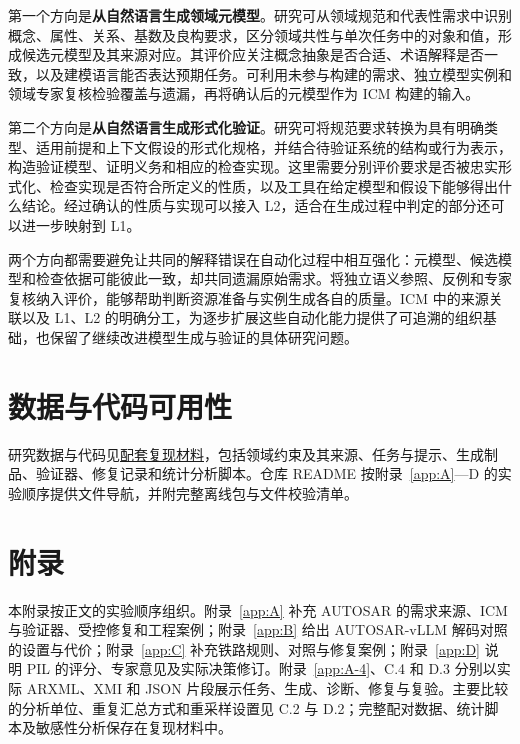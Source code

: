 \documentclass[pdflatex,iicol,sn-mathphys-num]{sn-jnl}
\begin{document}
第一个方向是\textbf{从自然语言生成领域元模型}。研究可从领域规范和代表性需求中识别概念、属性、关系、基数及良构要求，区分领域共性与单次任务中的对象和值，形成候选元模型及其来源对应。其评价应关注概念抽象是否合适、术语解释是否一致，以及建模语言能否表达预期任务。可利用未参与构建的需求、独立模型实例和领域专家复核检验覆盖与遗漏，再将确认后的元模型作为 ICM 构建的输入。


第二个方向是\textbf{从自然语言生成形式化验证}。研究可将规范要求转换为具有明确类型、适用前提和上下文假设的形式化规格，并结合待验证系统的结构或行为表示，构造验证模型、证明义务和相应的检查实现。这里需要分别评价要求是否被忠实形式化、检查实现是否符合所定义的性质，以及工具在给定模型和假设下能够得出什么结论。经过确认的性质与实现可以接入 L2，适合在生成过程中判定的部分还可以进一步映射到 L1。


两个方向都需要避免让共同的解释错误在自动化过程中相互强化：元模型、候选模型和检查依据可能彼此一致，却共同遗漏原始需求。将独立语义参照、反例和专家复核纳入评价，能够帮助判断资源准备与实例生成各自的质量。ICM 中的来源关联以及 L1、L2 的明确分工，为逐步扩展这些自动化能力提供了可追溯的组织基础，也保留了继续改进模型生成与验证的具体研究问题。


\section*{数据与代码可用性}\label{sec:data-availability}

研究数据与代码见\href{https://github.com/Abandooon/AI_XmlGenerator/tree/ATLAS}{配套复现材料}，包括领域约束及其来源、任务与提示、生成制品、验证器、修复记录和统计分析脚本。仓库 README 按附录~\ref{app:A}—D 的实验顺序提供文件导航，并附完整离线包与文件校验清单。


\FloatBarrier

\appendix

\section*{附录}

\renewcommand{\thetable}{\thesection\arabic{table}}

\renewcommand{\theHtable}{\thesection.\arabic{table}}

本附录按正文的实验顺序组织。附录~\ref{app:A} 补充 AUTOSAR 的需求来源、ICM 与验证器、受控修复和工程案例；附录~\ref{app:B} 给出 AUTOSAR-vLLM 解码对照的设置与代价；附录~\ref{app:C} 补充铁路规则、对照与修复案例；附录~\ref{app:D} 说明 PIL 的评分、专家意见及实际决策修订。附录~\ref{app:A-4}、C.4 和 D.3 分别以实际 ARXML、XMI 和 JSON 片段展示任务、生成、诊断、修复与复验。主要比较的分析单位、重复汇总方式和重采样设置见 C.2 与 D.2；完整配对数据、统计脚本及敏感性分析保存在复现材料中。
\end{document}
